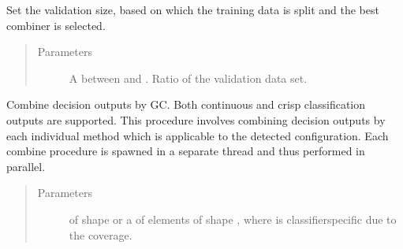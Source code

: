 \documentclass[letterpaper,10pt,english]{sphinxmanual}
\begin{document}
\begin{fulllineitems}
\begin{fulllineitems}
\begin{quote}
\begin{description}
\end{description}\end{quote}

\end{fulllineitems}


\begin{fulllineitems}
\label{\detokenize{pusion.auto.auto_combiner:pusion.auto.auto_combiner.AutoCombiner.set_validation_size}}
\sphinxAtStartPar
Set the validation size, based on which the training data is split and the best combiner is selected.
\begin{quote}\begin{description}
\item[{Parameters}] \leavevmode
\sphinxAtStartPar
{} \textendash{} A  between  and . Ratio of the validation data set.

\end{description}\end{quote}

\end{fulllineitems}


\begin{fulllineitems}
\label{\detokenize{pusion.auto.auto_combiner:pusion.auto.auto_combiner.AutoCombiner.combine_par}}
\sphinxAtStartPar
Combine decision outputs by GC. Both continuous and crisp classification outputs are supported.
This procedure involves combining decision outputs by each individual method which is applicable
to the detected configuration. Each combine procedure is spawned in a separate thread and thus performed
in parallel.
\begin{quote}\begin{description}
\item[{Parameters}] \leavevmode
\sphinxAtStartPar
{} \textendash{} 
\sphinxAtStartPar
{} of shape  or a  of
 elements of shape , where  is classifier\sphinxhyphen{}specific
due to the coverage.


\end{description}
\end{quote}
\end{fulllineitems}
\end{fulllineitems}
\end{document}
